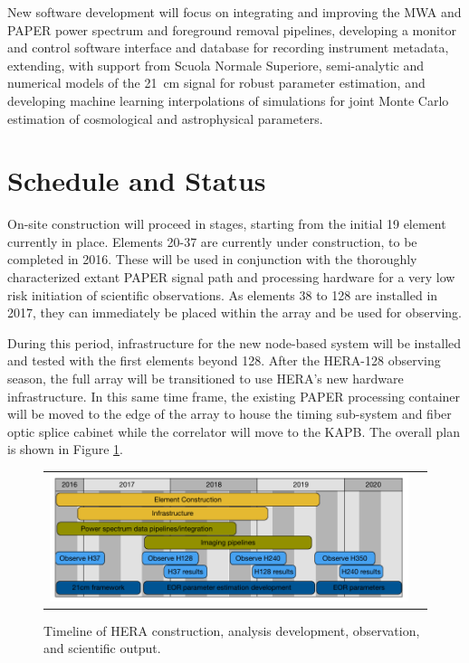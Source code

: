 \documentclass[preprint,11pt]{aastex}
\begin{document}
New software development will focus on integrating and improving the MWA and PAPER power spectrum and foreground removal pipelines,
developing a monitor and control software interface and database for recording instrument metadata,
extending, with support from Scuola Normale Superiore, semi-analytic and numerical models 
of the 21~cm signal for robust parameter estimation, and developing
machine learning interpolations of simulations for joint Monte Carlo estimation of cosmological and astrophysical parameters.


\section{Schedule and Status}
\label{sec:status}

\noindent On-site construction will proceed in stages, starting from the
initial 19 element currently in place.    Elements 20-37
are currently under construction, to be completed in 2016.  
 These will be used
in conjunction with the thoroughly characterized extant PAPER signal path and
processing hardware for a very low risk initiation of scientific observations.
As elements 38 to 128 are installed in 2017, they can
immediately be placed within the array and be used for observing. 

During this period, infrastructure for the new node-based system will be installed
and tested with the first elements beyond 128.  After the HERA-128 observing
season, the full array will be transitioned to use HERA's new hardware infrastructure.  
In this same time frame, the existing PAPER processing
container will be moved to the edge of the array to house the timing sub-system
and fiber optic splice cabinet while the correlator will move to the KAPB.
 The overall plan
is shown in Figure \ref{fig:timeline}.

\begin{figure}[h]
	\vspace{-7pt}
	\begin{tabular}{ll}
	\begin{minipage}{5in}
		\includegraphics[width=4.9in]{plots/timeline_short.pdf}
		\end{minipage} & \hspace{-.15in}
	\begin{minipage}{1.35in}
\captionsetup{justification=raggedright,
singlelinecheck=false
}
	\caption{Timeline of HERA construction, analysis development, observation, and scientific output.}
	\label{fig:timeline}
	\end{minipage}
	\end{tabular}
	\vspace{-8pt}
\end{figure}
\end{document}
